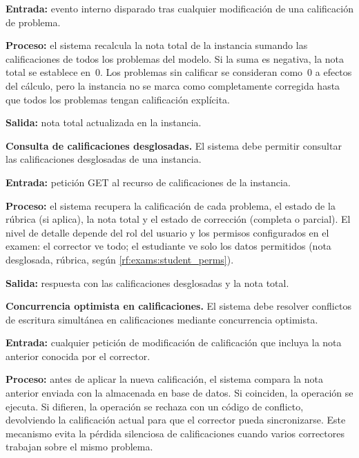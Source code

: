 \begin{functional}
    \textbf{Entrada:} evento interno disparado tras cualquier modificación de una
    calificación de problema.

    \textbf{Proceso:} el sistema recalcula la nota total de la instancia sumando las
    calificaciones de todos los problemas del modelo. Si la suma es negativa, la nota total
    se establece en~0. Los problemas sin calificar se consideran como~0 a efectos del
    cálculo, pero la instancia no se marca como completamente corregida hasta que todos los
    problemas tengan calificación explícita.

    \textbf{Salida:} nota total actualizada en la instancia.

    \item \textbf{Consulta de calificaciones desglosadas.} \label{rf:grading:detail}
    El sistema debe permitir consultar las calificaciones desglosadas de una instancia.

    \textbf{Entrada:} petición GET al recurso de calificaciones de la instancia.

    \textbf{Proceso:} el sistema recupera la calificación de cada problema, el estado de la
    rúbrica (si aplica), la nota total y el estado de corrección (completa o parcial). El
    nivel de detalle depende del rol del usuario y los permisos configurados en el examen:
    el corrector ve todo; el estudiante ve solo los datos permitidos (nota desglosada,
    rúbrica, según \cref{rf:exams:student_perms}).

    \textbf{Salida:} respuesta con las calificaciones desglosadas y la nota total.

    \item \textbf{Concurrencia optimista en calificaciones.}
    \label{rf:grading:concurrency}
    El sistema debe resolver conflictos de escritura simultánea en calificaciones mediante
    concurrencia optimista.

    \textbf{Entrada:} cualquier petición de modificación de calificación que incluya la nota
    anterior conocida por el corrector.

    \textbf{Proceso:} antes de aplicar la nueva calificación, el sistema compara la nota
    anterior enviada con la almacenada en base de datos. Si coinciden, la operación se
    ejecuta. Si difieren, la operación se rechaza con un código de conflicto, devolviendo
    la calificación actual para que el corrector pueda sincronizarse. Este mecanismo evita
    la pérdida silenciosa de calificaciones cuando varios correctores trabajan sobre el
    mismo problema.


\end{functional}
